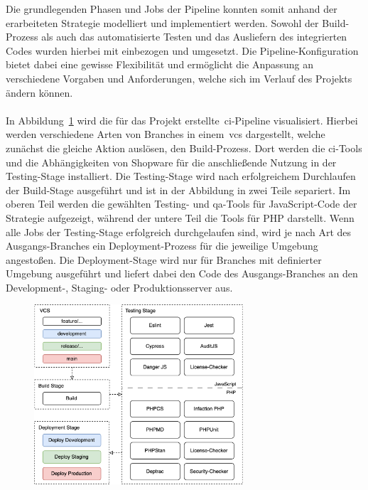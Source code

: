 Die grundlegenden Phasen und Jobs der Pipeline konnten somit anhand der erarbeiteten Strategie modelliert und
implementiert werden.
Sowohl der Build-Prozess als auch das automatisierte Testen und das Ausliefern des integrierten Codes wurden hierbei
mit einbezogen und umgesetzt.
Die Pipeline-Konfiguration bietet dabei eine gewisse Flexibilität und ermöglicht die Anpassung an verschiedene
Vorgaben und Anforderungen, welche sich im Verlauf des Projekts ändern können.
\\\\
In Abbildung\ \ref{fig:ci-pipeline-concept} wird die für das Projekt erstellte\ \acrshort{ci}-Pipeline visualisiert.
Hierbei werden verschiedene Arten von Branches in einem\ \acrshort{vcs} dargestellt, welche zunächst die gleiche Aktion
auslösen, den Build-Prozess.
Dort werden die \acrshort{ci}-Tools und die Abhängigkeiten von Shopware für die anschließende Nutzung in der
Testing-Stage installiert.
Die Testing-Stage wird nach erfolgreichem Durchlaufen der Build-Stage ausgeführt und ist in der Abbildung in zwei
Teile separiert.
Im oberen Teil werden die gewählten Testing- und \acrshort{qa}-Tools für JavaScript-Code der Strategie aufgezeigt,
während der untere Teil die Tools für PHP darstellt.
Wenn alle Jobs der Testing-Stage erfolgreich durchgelaufen sind, wird je nach Art des Ausgangs-Branches ein
Deployment-Prozess für die jeweilige Umgebung angestoßen.
Die Deployment-Stage wird nur für Branches mit definierter Umgebung ausgeführt und liefert dabei den Code des
Ausgangs-Branches an den Development-, Staging- oder Produktionsserver aus.

\begin{figure}[H]
    \centering
    \includegraphics[width=0.69420\textwidth]{images/content/ci-pipeline-concept}
    \label{fig:ci-pipeline-concept}
\end{figure}

